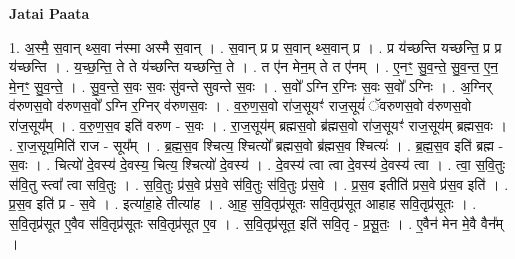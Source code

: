 \documentclass[17pt]{extarticle}
\begin{document}
\textbf{Jatai Paata} \newline

1. अ॒स्मै॒ स॒वान् थ्स॒वा न॑स्मा अस्मै स॒वान् । . स॒वान् प्र प्र स॒वान् थ्स॒वान् प्र । . प्र य॑च्छन्ति यच्छन्ति॒ प्र प्र य॑च्छन्ति । . य॒च्छ॒न्ति॒ ते ते य॑च्छन्ति यच्छन्ति॒ ते । . त ए॑न मेन॒म् ते त ए॑नम् । . ए॒नꣳ॒॒ सु॒व॒न्ते॒ सु॒व॒न्त॒ ए॒न॒ मे॒नꣳ॒॒ सु॒व॒न्ते॒ । . सु॒व॒न्ते॒ स॒वः स॒वः सु॑वन्ते सुवन्ते स॒वः । . स॒वो᳚ ऽग्नि र॒ग्निः स॒वः स॒वो᳚ ऽग्निः । . अ॒ग्निर् व॑रुणस॒वो व॑रुणस॒वो᳚ ऽग्नि र॒ग्निर् व॑रुणस॒वः । . व॒रु॒ण॒स॒वो रा॑ज॒सूयꣳ॑ राज॒सूयं॑ ॅवरुणस॒वो व॑रुणस॒वो रा॑ज॒सूय᳚म् । . व॒रु॒ण॒स॒व इति॑ वरुण - स॒वः । . रा॒ज॒सूय॑म् ब्रह्मस॒वो ब्र॑ह्मस॒वो रा॑ज॒सूयꣳ॑ राज॒सूय॑म् ब्रह्मस॒वः । . रा॒ज॒सूय॒मिति॑ राज - सूय᳚म् । . ब्र॒ह्म॒स॒व श्चित्य॒ श्चित्यो᳚ ब्रह्मस॒वो ब्र॑ह्मस॒व श्चित्यः॑ । . ब्र॒ह्म॒स॒व इति॑ ब्रह्म - स॒वः । . चित्यो॑ दे॒वस्य॑ दे॒वस्य॒ चित्य॒ श्चित्यो॑ दे॒वस्य॑ । . दे॒वस्य॑ त्वा त्वा दे॒वस्य॑ दे॒वस्य॑ त्वा । . त्वा॒ स॒वि॒तुः स॑वि॒तु स्त्वा᳚ त्वा सवि॒तुः । . स॒वि॒तुः प्र॑स॒वे प्र॑स॒वे स॑वि॒तुः स॑वि॒तुः प्र॑स॒वे । . प्र॒स॒व इतीति॑ प्रस॒वे प्र॑स॒व इति॑ । . प्र॒स॒व इति॑ प्र - स॒वे । . इत्या॑हा॒हे तीत्या॑ह । . आ॒ह॒ स॒वि॒तृप्र॑सूतः सवि॒तृप्र॑सूत आहाह सवि॒तृप्र॑सूतः । . स॒वि॒तृप्र॑सूत ए॒वैव स॑वि॒तृप्र॑सूतः सवि॒तृप्र॑सूत ए॒व । . स॒वि॒तृप्र॑सूत॒ इति॑ सवि॒तृ - प्र॒सू॒तः॒ । . ए॒वैन॑ मेन मे॒वै वैन᳚म् । \newline
\end{document}
